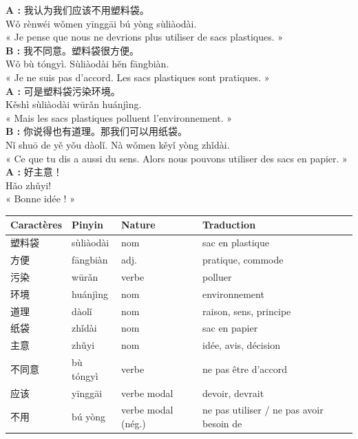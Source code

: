 \documentclass[11pt]{article}
\begin{document}
\begin{textebox}
\textbf{A :} 我认为我们应该不用塑料袋。\\
Wǒ rènwéi wǒmen yīnggāi bú yòng sùliàodài.\\
« Je pense que nous ne devrions plus utiliser de sacs plastiques. »\\[4pt]
\textbf{B :} 我不同意。塑料袋很方便。\\
Wǒ bù tóngyì. Sùliàodài hěn fāngbiàn.\\
« Je ne suis pas d'accord. Les sacs plastiques sont pratiques. »\\[4pt]
\textbf{A :} 可是塑料袋污染环境。\\
Kěshì sùliàodài wūrǎn huánjìng.\\
« Mais les sacs plastiques polluent l'environnement. »\\[4pt]
\textbf{B :} 你说得也有道理。那我们可以用纸袋。\\
Nǐ shuō de yě yǒu dàolǐ. Nà wǒmen kěyǐ yòng zhǐdài.\\
« Ce que tu dis a aussi du sens. Alors nous pouvons utiliser des sacs en papier. »\\[4pt]
\textbf{A :} 好主意！\\
Hǎo zhǔyi!\\
« Bonne idée ! »
\end{textebox}

\begin{center}
\begin{tabularx}{\linewidth}{|X|X|X|X|}
\hline
\rowcolor{popblueL} \textbf{Caractères} & \textbf{Pinyin} & \textbf{Nature} & \textbf{Traduction} \\
\hline
塑料袋 & sùliàodài & nom & sac en plastique \\
\hline
方便 & fāngbiàn & adj. & pratique, commode \\
\hline
污染 & wūrǎn & verbe & polluer \\
\hline
环境 & huánjìng & nom & environnement \\
\hline
道理 & dàolǐ & nom & raison, sens, principe \\
\hline
纸袋 & zhǐdài & nom & sac en papier \\
\hline
主意 & zhǔyi & nom & idée, avis, décision \\
\hline
不同意 & bù tóngyì & verbe & ne pas être d'accord \\
\hline
应该 & yīnggāi & verbe modal & devoir, devrait \\
\hline
不用 & bú yòng & verbe modal (nég.) & ne pas utiliser / ne pas avoir besoin de \\
\hline
\end{tabularx}
\end{center}
\end{document}
